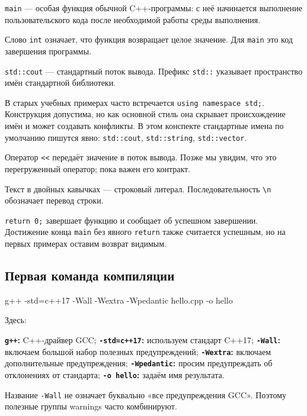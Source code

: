 \texttt{main} --- особая функция обычной C++-программы: с неё начинается
выполнение пользовательского кода после необходимой работы среды выполнения.

Слово \texttt{int} означает, что функция возвращает целое значение.
Для \texttt{main} это код завершения программы.

\texttt{std::cout} --- стандартный поток вывода. Префикс \texttt{std::}
указывает пространство имён стандартной библиотеки.

\begin{warningbox}
В старых учебных примерах часто встречается \texttt{using namespace std;}.
Конструкция допустима, но как основной стиль она скрывает происхождение имён
и может создавать конфликты. В этом конспекте стандартные имена по умолчанию
пишутся явно: \texttt{std::cout}, \texttt{std::string}, \texttt{std::vector}.
\end{warningbox}

Оператор \texttt{<<} передаёт значение в поток вывода. Позже мы увидим, что
это перегруженный оператор; пока важен его контракт.

Текст в двойных кавычках --- строковый литерал.
Последовательность \texttt{\textbackslash n} обозначает перевод строки.

\texttt{return 0;} завершает функцию и сообщает об успешном завершении.
Достижение конца \texttt{main} без явного \texttt{return} также считается
успешным, но на первых примерах оставим возврат видимым.

\subsection{Первая команда компиляции}

\begin{shellcode}
g++ -std=c++17 -Wall -Wextra -Wpedantic hello.cpp -o hello
\end{shellcode}

Здесь:

\textbf{\texttt{g++}:} C++-драйвер GCC; \textbf{\texttt{-std=c++17}:} используем стандарт C++17; \textbf{\texttt{-Wall}:} включаем большой набор полезных предупреждений; \textbf{\texttt{-Wextra}:} включаем дополнительные предупреждения; \textbf{\texttt{-Wpedantic}:} просим предупреждать об отклонениях от стандарта; \textbf{\texttt{-o hello}:} задаём имя результата.

\begin{warningbox}
Название \texttt{-Wall} не означает буквально «все предупреждения GCC».
Поэтому полезные группы warnings часто комбинируют.
\end{warningbox}


